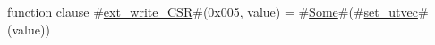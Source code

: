 function clause #\hyperref[sailRISCVzextzywritezyCSR]{ext\_write\_CSR}#(0x005, value) = { #\hyperref[sailRISCVzSome]{Some}#(#\hyperref[sailRISCVzsetzyutvec]{set\_utvec}#(value)) }

